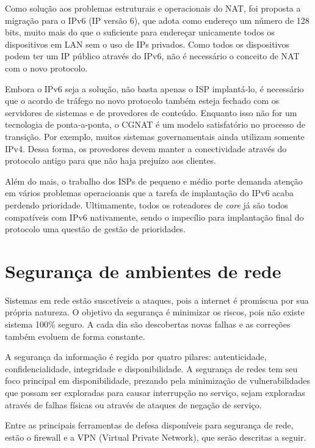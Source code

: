     Como solução aos problemas estruturais e operacionais do NAT, foi proposta a migração para o IPv6 (IP versão 6), que adota como endereço um número de 128 bits, muito mais do que o suficiente para endereçar unicamente todos os dispositivos em LAN sem o uso de IPs privados. Como todos os dispositivos podem ter um IP público através do IPv6, não é necessário o conceito de NAT com o novo protocolo.
    
    Embora o IPv6 seja a solução, não basta apenas o ISP implantá-lo, é necessário que o acordo de tráfego no novo protocolo também esteja fechado com os servidores de sistemas e de provedores de conteúdo. Enquanto isso não for um tecnologia de ponta-a-ponta, o CGNAT é um modelo satisfatório no processo de transição. Por exemplo, muitos sistemas governamentais ainda utilizam somente IPv4. Dessa forma, os provedores devem manter a conectividade através do protocolo antigo para que não haja prejuízo aos clientes. 
    
    Além do mais, o trabalho dos ISPs de pequeno e médio porte demanda  atenção em vários problemas operacioanis que a tarefa de implantação do IPv6 acaba perdendo prioridade. Ultimamente, todos os roteadores de \textit{core} já são todos compatíveis com IPv6 nativamente, sendo o impecílio para implantação final do protocolo uma questão de gestão de prioridades.

\section{Segurança de ambientes de rede}

    Sistemas em rede estão suscetíveis a ataques, pois a internet é promíscua por sua própria natureza. O objetivo da segurança é minimizar os riscos, pois não existe sistema 100\% seguro. A cada dia são descobertas novas falhas e as correções também evoluem de forma constante.
    
    A segurança da informação é regida por quatro pilares: autenticidade, confidencialidade, integridade e disponibilidade. A segurança de redes tem seu foco principal em disponibilidade, prezando pela minimização de vulnerabilidades que possam ser exploradas para causar interrupção no serviço, sejam exploradas através de falhas físicas ou através de ataques de negação de serviço.
    
    Entre as principais ferramentas de defesa disponíveis para segurança de rede, estão o firewall e a VPN (Virtual Private Network), que serão descritas a seguir.

